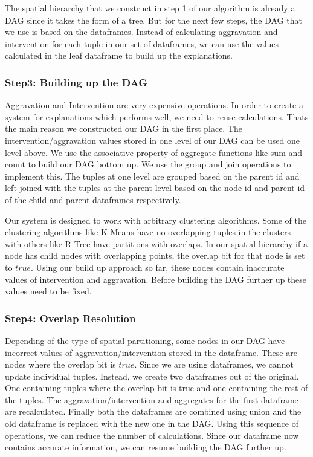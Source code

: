 The spatial hierarchy that we construct in step 1 of our algorithm is already a DAG since it takes the form of a tree. But for the next few steps, the DAG that we use is based on the dataframes. Instead of calculating aggravation and intervention for each tuple in our set of dataframes, we can use the values calculated in the leaf dataframe to build up the explanations.

\subsubsection{Step3: Building up the DAG}
Aggravation and Intervention are very expensive operations. In order to create a system for explanations which performs well, we need to reuse calculations. Thats the main reason we constructed our DAG in the first place. The intervention/aggravation values stored in one level of our DAG can be used one level above. We use the associative property of aggregate functions like sum and count to build our DAG bottom up. We use the group and join operations to implement this. The tuples at one level are grouped based on the parent id and left joined with the tuples at the parent level based on the node id and parent id of the child and parent dataframes respectively. 

Our system is designed to work with arbitrary clustering algorithms. Some of the clustering algorithms like K-Means have no overlapping tuples in the clusters with others like R-Tree have partitions with overlaps. In our spatial hierarchy if a node has child nodes with overlapping points, the overlap bit for that node is set to $true$. Using our build up approach so far, these nodes contain inaccurate values of intervention and aggravation. Before building the DAG further up these values need to be fixed.

\subsubsection{Step4: Overlap Resolution}
Depending of the type of spatial partitioning, some nodes in our DAG have incorrect values of aggravation/intervention stored in the dataframe. These are nodes where the overlap bit is $true$. Since we are using dataframes, we cannot update individual tuples. Instead, we create two dataframes out of the original. One containing tuples where the overlap bit is true and one containing the rest of the tuples. The aggravation/intervention and aggregates for the first dataframe are recalculated. Finally both the dataframes are combined using union and the old dataframe is replaced with the new one in the DAG. Using this sequence of operations, we can reduce the number of calculations. Since our dataframe now contains accurate information, we can resume building the DAG further up.


